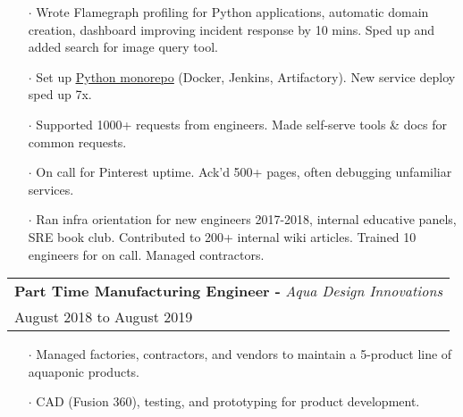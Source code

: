 \documentclass[letterpaper, oneside, final]{scrartcl} %
\begin{document}
\begin{center}
\begin{itemize}
\item[$\cdot$] Wrote Flamegraph profiling for Python applications, automatic domain creation, dashboard improving incident response by 10 mins. Sped up and added search for image query tool.\\[10pt]
\item[$\cdot$] Set up \underline{\href{https://medium.com/pinterest-engineering/building-a-python-monorepo-for-fast-reliable-development-be763781f67}{Python monorepo}} (Docker, Jenkins, Artifactory). New service deploy sped up 7x.\\[10pt]
\item[$\cdot$] Supported 1000+ requests from engineers. Made self-serve tools \& docs for common requests.\\[10pt]
\item[$\cdot$] On call for Pinterest uptime. Ack'd 500+ pages, often debugging unfamiliar services.\\[10pt]
\item[$\cdot$] Ran infra orientation for new engineers 2017-2018, internal educative panels, SRE book club. Contributed to 200+ internal wiki articles. Trained 10 engineers for on call. Managed contractors.\\[10pt]

\end{itemize}

\begingroup\setlength{\fboxsep}{0pt}
\colorbox{mygray}{
\begin{flushleft}
\begin{tabularx}{\textwidth}{l}
\textbf{Part Time Manufacturing Engineer -} \textit{Aqua Design Innovations}\\
August 2018 to August 2019\\
\end{tabularx}
\end{flushleft}
}\endgroup
\vspace{-0.1cm}
\begin{itemize} \itemsep-0.2cm
\item[$\cdot$] Managed factories, contractors, and vendors to maintain a 5-product line of aquaponic products. \\
\item[$\cdot$] CAD (Fusion 360), testing, and prototyping for product development.\\
\end{itemize}


\end{center}
\end{document}
